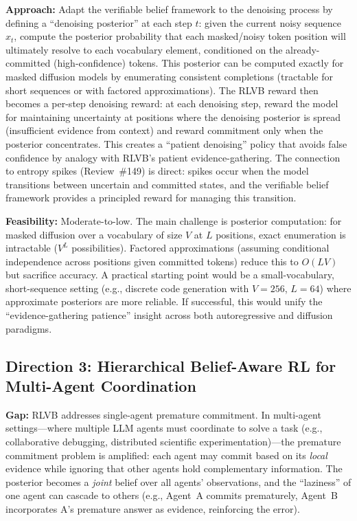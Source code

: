 \documentclass[11pt,a4paper]{article}
\begin{document}
\textbf{Approach:} Adapt the verifiable belief framework to the denoising process by defining a ``denoising posterior'' at each step $t$: given the current noisy sequence $x_t$, compute the posterior probability that each masked/noisy token position will ultimately resolve to each vocabulary element, conditioned on the already-committed (high-confidence) tokens. This posterior can be computed exactly for masked diffusion models by enumerating consistent completions (tractable for short sequences or with factored approximations). The RLVB reward then becomes a per-step denoising reward: at each denoising step, reward the model for maintaining uncertainty at positions where the denoising posterior is spread (insufficient evidence from context) and reward commitment only when the posterior concentrates. This creates a ``patient denoising'' policy that avoids false confidence by analogy with RLVB's patient evidence-gathering. The connection to entropy spikes (Review~\#149) is direct: spikes occur when the model transitions between uncertain and committed states, and the verifiable belief framework provides a principled reward for managing this transition.

\textbf{Feasibility:} Moderate-to-low. The main challenge is posterior computation: for masked diffusion over a vocabulary of size $V$ at $L$ positions, exact enumeration is intractable ($V^L$ possibilities). Factored approximations (assuming conditional independence across positions given committed tokens) reduce this to $O(LV)$ but sacrifice accuracy. A practical starting point would be a small-vocabulary, short-sequence setting (e.g., discrete code generation with $V{=}256$, $L{=}64$) where approximate posteriors are more reliable. If successful, this would unify the ``evidence-gathering patience'' insight across both autoregressive and diffusion paradigms.

\subsection{Direction 3: Hierarchical Belief-Aware RL for Multi-Agent Coordination}
\textbf{Gap:} RLVB addresses single-agent premature commitment. In multi-agent settings---where multiple LLM agents must coordinate to solve a task (e.g., collaborative debugging, distributed scientific experimentation)---the premature commitment problem is amplified: each agent may commit based on its \emph{local} evidence while ignoring that other agents hold complementary information. The posterior becomes a \emph{joint} belief over all agents' observations, and the ``laziness'' of one agent can cascade to others (e.g., Agent~A commits prematurely, Agent~B incorporates A's premature answer as evidence, reinforcing the error).
\end{document}
